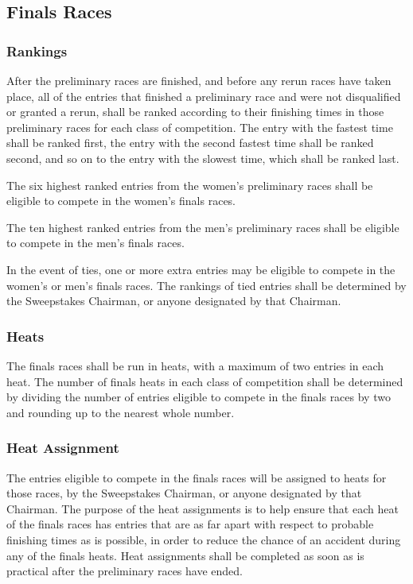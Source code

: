 \subsection{Finals Races}

\subsubsection{Rankings}

After the preliminary races are finished, and before any rerun races have taken place, all of the entries that finished a preliminary race and were not disqualified or granted a rerun, shall be ranked according to their finishing times in those preliminary races for each class of competition. The entry with the fastest time shall be ranked first, the entry with the second fastest time shall be ranked second, and so on to the entry with the slowest time, which shall be ranked last.

The six highest ranked entries from the women's preliminary races shall be eligible to compete in the women's finals races.

The ten highest ranked entries from the men's preliminary races shall be eligible to compete in the men's finals races.

In the event of ties, one or more extra entries may be eligible to compete in the women's or men's finals races. The rankings of tied entries shall be determined by the Sweepstakes Chairman, or anyone designated by that Chairman.

\subsubsection{Heats}

The finals races shall be run in heats, with a maximum of two entries in each heat. The number of finals heats in each class of competition shall be determined by dividing the number of entries eligible to compete in the finals races by two and rounding up to the nearest whole number.

\subsubsection{Heat Assignment}

The entries eligible to compete in the finals races will be assigned to heats for those races, by the Sweepstakes Chairman, or anyone designated by that Chairman. The purpose of the heat assignments is to help ensure that each heat of the finals races has entries that are as far apart with respect to probable finishing times as is possible, in order to reduce the chance of an accident during any of the finals heats. Heat assignments shall be completed as soon as is practical after the preliminary races have ended.

